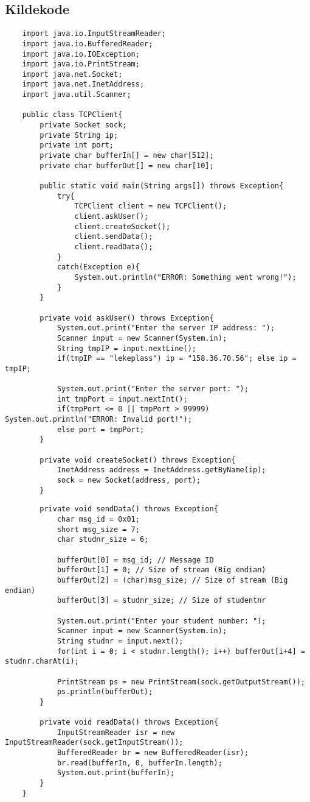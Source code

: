 \subsection{Kildekode}
\begin{lstlisting}
	import java.io.InputStreamReader;
	import java.io.BufferedReader;
	import java.io.IOException;
	import java.io.PrintStream;
	import java.net.Socket;
	import java.net.InetAddress;
	import java.util.Scanner;

	public class TCPClient{
		private Socket sock;
		private String ip;
		private int port;
		private char bufferIn[] = new char[512];
		private char bufferOut[] = new char[10];
		
		public static void main(String args[]) throws Exception{
			try{
				TCPClient client = new TCPClient();
				client.askUser();
				client.createSocket();
				client.sendData();
				client.readData();
			}
			catch(Exception e){
				System.out.println("ERROR: Something went wrong!");
			}
		}

		private void askUser() throws Exception{
			System.out.print("Enter the server IP address: ");
			Scanner input = new Scanner(System.in);
			String tmpIP = input.nextLine();
			if(tmpIP == "lekeplass") ip = "158.36.70.56"; else ip = tmpIP;

			System.out.print("Enter the server port: ");
			int tmpPort = input.nextInt();
			if(tmpPort <= 0 || tmpPort > 99999) System.out.println("ERROR: Invalid port!");
			else port = tmpPort;
		}

		private void createSocket() throws Exception{
			InetAddress address = InetAddress.getByName(ip);
			sock = new Socket(address, port);
		}
\end{lstlisting}
\newpage
\begin{lstlisting}
		private void sendData() throws Exception{
			char msg_id = 0x01;
			short msg_size = 7;
			char studnr_size = 6;

			bufferOut[0] = msg_id; // Message ID
			bufferOut[1] = 0; // Size of stream (Big endian)
			bufferOut[2] = (char)msg_size; // Size of stream (Big endian)
			bufferOut[3] = studnr_size; // Size of studentnr
			
			System.out.print("Enter your student number: ");
			Scanner input = new Scanner(System.in);
			String studnr = input.next();
			for(int i = 0; i < studnr.length(); i++) bufferOut[i+4] = studnr.charAt(i);
			
			PrintStream ps = new PrintStream(sock.getOutputStream());
			ps.println(bufferOut);
		}

		private void readData() throws Exception{
			InputStreamReader isr = new InputStreamReader(sock.getInputStream());
			BufferedReader br = new BufferedReader(isr);
			br.read(bufferIn, 0, bufferIn.length);
			System.out.print(bufferIn);
		}
	}
\end{lstlisting}
